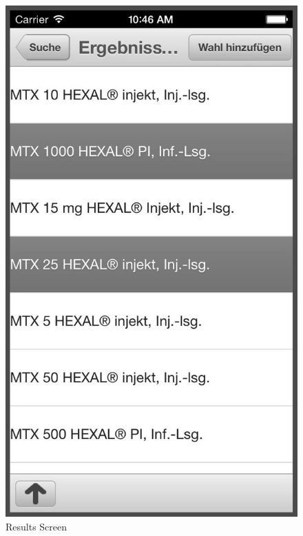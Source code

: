 \begin{figure}[!b]
\begin{minipage}[b]{0.45\linewidth}
        \includegraphics[width=0.8025\linewidth]{figures/Results_Alt_bw.jpg}
        \caption[List Screen to add to Comparison List]{Results Screen}
        \label{fig:AlternativeListScreen}
    \end{minipage}
\end{figure}
\\
